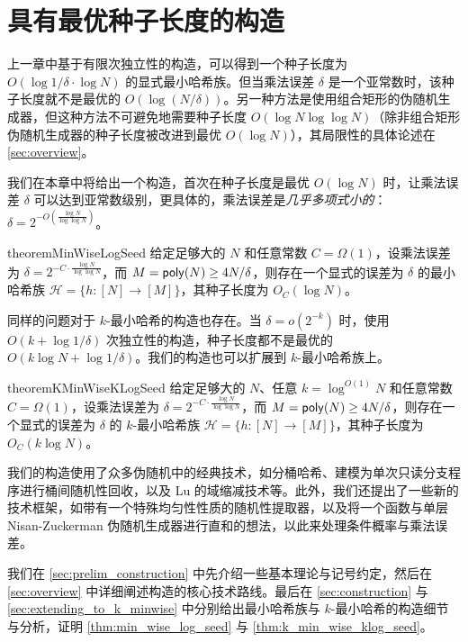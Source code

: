 \section{具有最优种子长度的构造}\label{sec:optimal_seed_length}

上一章中基于有限次独立性的构造，可以得到一个种子长度为 $O(\log 1 / \delta \cdot \log N)$ 的显式最小哈希族。但当乘法误差 $\delta$ 是一个亚常数时，该种子长度就不是最优的 $O(\log (N / \delta))$。另一种方法是使用组合矩形的伪随机生成器，但这种方法不可避免地需要种子长度 $O(\log N \log \log N)$（除非组合矩形伪随机生成器的种子长度被改进到最优 $O(\log N)$），其局限性的具体论述在 \ref{sec:overview}。

我们在本章中将给出一个构造，首次在种子长度是最优 $O(\log N)$ 时，让乘法误差 $\delta$ 可以达到亚常数级别，更具体的，乘法误差是\emph{几乎多项式小的}：$\delta = 2^{-O\left( \frac{\log N}{\log \log N} \right)}$。

\begin{restatable}{theorem}{MinWiseLogSeed}\label{thm:min_wise_log_seed}
    给定足够大的 $N$ 和任意常数 $C = \Omega(1)$，设乘法误差为 $\delta = 2^{-C \cdot \frac{\log N}{\log \log N}}$，而 $M = \mathsf{poly}(N) \ge 4 N / \delta$，则存在一个显式的误差为 $\delta$ 的最小哈希族 $\mathcal{H} = \{h : [N] \to [M]\}$，其种子长度为 $O_C(\log N)$。
\end{restatable}

同样的问题对于 $k$-最小哈希的构造也存在。当 $\delta = o(2^{-k})$ 时，使用 $O(k + \log 1 / \delta)$ 次独立性的构造，种子长度都不是最优的 $O(k \log N + \log 1 / \delta)$。我们的构造也可以扩展到 $k$-最小哈希族上。

\begin{restatable}{theorem}{KMinWiseKLogSeed}\label{thm:k_min_wise_klog_seed}
    给定足够大的 $N$、任意 $k = \log^{O(1)} N$ 和任意常数 $C = \Omega(1)$，设乘法误差为 $\delta = 2^{-C \cdot \frac{\log N}{\log \log N}}$，而 $M = \mathsf{poly}(N) \ge 4 N / \delta$，则存在一个显式的误差为 $\delta$ 的 $k$-最小哈希族 $\mathcal{H} = \{h : [N] \to [M]\}$，其种子长度为 $O_C(k \log N)$。
\end{restatable}

我们的构造使用了众多伪随机中的经典技术，如分桶哈希、建模为单次只读分支程序进行桶间随机性回收，以及 Lu \cite{Lu02_domain_reduction} 的域缩减技术等。此外，我们还提出了一些新的技术框架，如带有一个特殊均匀性性质的随机性提取器，以及将一个函数与单层 Nisan-Zuckerman 伪随机生成器进行直和的想法，以此来处理条件概率与乘法误差。

我们在 \ref{sec:prelim_construction} 中先介绍一些基本理论与记号约定，然后在 \ref{sec:overview} 中详细阐述构造的核心技术路线。最后在 \ref{sec:construction} 与 \ref{sec:extending_to_k_minwise} 中分别给出最小哈希族与 $k$-最小哈希的构造细节与分析，证明 \cref{thm:min_wise_log_seed} 与 \cref{thm:k_min_wise_klog_seed}。

